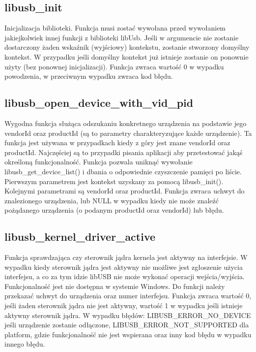 \documentclass{BscUS}
\begin{document}
\subsection{libusb\_init}
Inicjalizacja biblioteki.
\newline
Funkcja musi zostać wywołana przed wywołaniem jakiejkolwiek innej funkcji z biblioteki libUsb.
\newline
Jeśli w argumencie nie zostanie dostarczony żaden wskaźnik (wyjściowy) kontekstu, zostanie stworzony domyślny kontekst. W przypadku jeśli domyślny kontekst już istnieje zostanie on ponownie użyty (bez ponownej inicjalizacji).
\newline
Funkcja zwraca wartość 0 w wypadku powodzenia, w przeciwnym wypadku zwraca kod błędu.
\subsection{libusb\_open\_device\_with\_vid\_pid}
Wygodna funkcja służąca odszukaniu konkretnego urządzenia na podstawie jego vendorId oraz productId (są to parametry charakteryzujące każde urządzenie).
\newline
Ta funkcja jest używana w przypadkach kiedy z góry jest znane vendorId oraz productId. Najczęściej są to przypadki pisania aplikacji aby przetestować jakąś określoną funkcjonalność. Funkcja pozwala uniknąć wywołanie libusb\_get\_device\_list() i dbania o odpowiednie czyszczenie pamięci po liście.
\newline
Pierwszym parametrem jest kontekst uzyskany za pomocą libusb\_init().
\newline
Kolejnymi parametrami są vendorId oraz productId.
\newline
Funkcja zwraca uchwyt do znalezionego urządzenia, lub NULL w wypadku kiedy nie może znaleźć pożądanego urządzenia (o podanym productId oraz vendorId) lub błędu.
\subsection{libusb\_kernel\_driver\_active}
Funkcja sprawdzająca czy sterownik jądra kernela jest aktywny na interfejsie.
\newline
W wypadku kiedy sterownik jądra jest aktywny nie możliwe jest zgłoszenie użycia interfejsu, a co za tym idzie libUSB nie może wykonać operacji wejścia/wyjścia.
\newline
Funkcjonalność jest nie dostępna w systemie Windows.
\newline
Do funkcji należy przekazać uchwyt do urządzenia oraz numer interfejsu.
\newline
Funkcja zwraca wartość 0, jeśli żaden sterownik jądra nie jest aktywny, wartość 1 w wypadku jeśli istnieje aktywny sterownik jądra.
\newline
W wypadku błędów: LIBUSB\_ERROR\_NO\_DEVICE jeśli urządzenie zostanie odłączone, LIBUSB\_ERROR\_NOT\_SUPPORTED dla platform, gdzie funkcjonalność nie jest wspierana oraz inny kod błędu w wypadku innego błędu.
\end{document}
